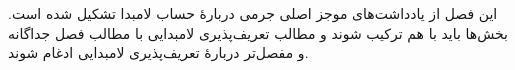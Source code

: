 \documentclass[../../../include/open-logic-chapter]{subfiles}
\begin{document}

\begin{editorial}
این فصل از یادداشت‌های موجز اصلی جرمی دربارهٔ حساب لامبدا تشکیل شده
است. بخش‌ها باید با هم ترکیب شوند و مطالب تعریف‌پذیری لامبدایی با مطالب
فصل جداگانه و مفصل‌تر دربارهٔ تعریف‌پذیری لامبدایی ادغام شوند.
\end{editorial}














\OLEndChapterHook
\end{document}
